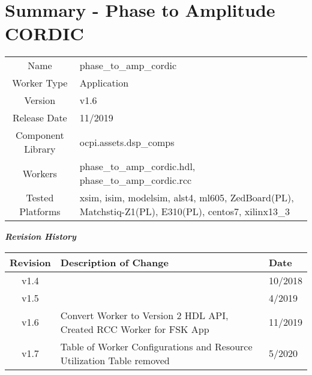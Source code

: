 \documentclass{article}
\author{} %
\date{Version \docVersion} %
\title{\docTitle}
\def\docVersion{1.6}
\def\comp{phase\_to\_amp\_cordic}
\def\Comp{Phase to Amplitude CORDIC}
\begin{document}
\section*{Summary - \Comp}
\begin{tabular}{|c|M{13.5cm}|}
	\hline
	                  &                                                    \\
	\hline
	Name              & \comp                                              \\
	\hline
	Worker Type       & Application                                        \\
	\hline
	Version           & v\docVersion \\
	\hline
	Release Date      & 11/2019 \\
	\hline
	Component Library & ocpi.assets.dsp\_comps                              \\
	\hline
	Workers           & \comp.hdl, \comp.rcc                                                                                   \\
	\hline
	Tested Platforms  & xsim, isim, modelsim, alst4, ml605, ZedBoard(PL), Matchstiq-Z1(PL), E310(PL), centos7, xilinx13\_3 \\
	\hline
\end{tabular}

\begin{center}
	\textit{\textbf{Revision History}}
	\begin{table}[H]
	\label{table:revisions} %
		\begin{tabularx}{\textwidth}{|c|X|l|}
		\hline
		\rowcolor{blue}
		\textbf{Revision} & \textbf{Description of Change} & \textbf{Date} \\
		\hline
		v1.4 & & 10/2018 \\
		\hline
		v1.5 & & 4/2019\\
		\hline
		v1.6 & Convert Worker to Version 2 HDL API, Created RCC Worker for FSK App & 11/2019\\
		\hline
		v1.7 & Table of Worker Configurations and Resource Utilization Table removed & 5/2020 \\
			\hline
		\end{tabularx}
	\end{table}
\end{center}
\end{document}
